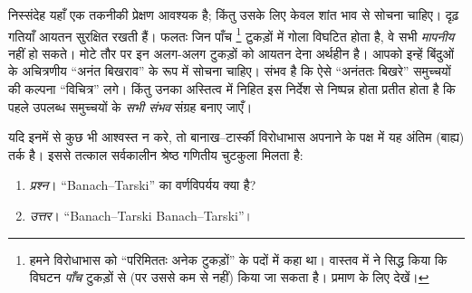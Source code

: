 \documentclass[../../../include/open-logic-section]{subfiles}
\begin{document}
निस्संदेह यहाँ एक तकनीकी प्रेक्षण आवश्यक है; किंतु उसके लिए केवल शांत भाव
से सोचना चाहिए। दृढ़ गतियाँ आयतन सुरक्षित रखती हैं। फलतः जिन पाँच
\footnote{हमने विरोधाभास को ``परिमिततः अनेक टुकड़ों'' के पदों में कहा था।
वास्तव में \citet{Robinson1947} ने सिद्ध किया कि विघटन \emph{पाँच} टुकड़ों
से (पर उससे कम से नहीं) किया जा सकता है। प्रमाण के लिए
\citet[pp.~66--7]{Wagon2016} देखें।} टुकड़ों में गोला विघटित होता है, वे सभी
\emph{मापनीय} नहीं हो सकते। मोटे तौर पर इन अलग-अलग टुकड़ों को आयतन देना
अर्थहीन है। आपको इन्हें बिंदुओं के अचित्रणीय ``अनंत बिखराव'' के रूप में
सोचना चाहिए। संभव है कि ऐसे ``अनंततः बिखरे'' समुच्चयों की कल्पना ``विचित्र''
लगे। किंतु उनका अस्तित्व \stagesacc{} में निहित इस निर्देश से निष्पन्न होता
प्रतीत होता है कि पहले उपलब्ध समुच्चयों के \emph{सभी संभव} संग्रह बनाए जाएँ।

यदि इनमें से कुछ भी आश्वस्त न करे, तो बानाख--टार्स्की विरोधाभास अपनाने के
पक्ष में यह अंतिम (बाह्य) तर्क है। इससे तत्काल सर्वकालीन श्रेष्ठ गणितीय
चुटकुला मिलता है:
\begin{enumerate}
	\item[] \emph{प्रश्न}। ``Banach--Tarski'' का वर्णविपर्यय क्या है?
	\item[] \emph{उत्तर}। ``Banach--Tarski Banach--Tarski''।
\end{enumerate}
\end{document}
